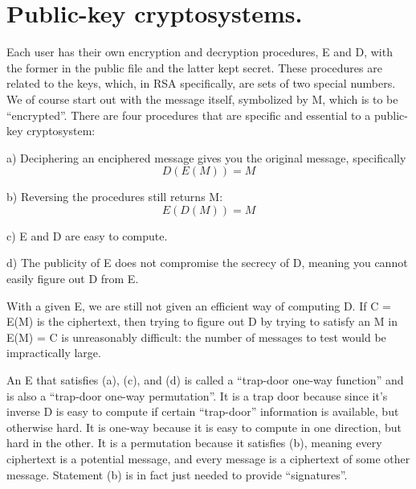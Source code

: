 \documentclass{article}
\begin{document}
\section{Public-key cryptosystems.}

Each user has their own encryption and decryption procedures, E and D, with the former in the public ﬁle and the latter kept secret. These procedures are related to the keys, which, in RSA speciﬁcally, are sets of two special numbers. We of course start out with the message itself, symbolized by M, which is to be “encrypted”. There are four procedures that are speciﬁc and essential to a public-key cryptosystem:
\\\par\setlength\parindent{2em}

a) Deciphering an enciphered message gives you the original message, speciﬁcally
\begin{equation}
D(E(M)) = M
\end{equation}

b) Reversing the procedures still returns M:
\begin{equation}
E(D(M)) = M
\end{equation}

c) E and D are easy to compute.
\\\par\setlength\parindent{2em}

d) The publicity of E does not compromise the secrecy of D, meaning you cannot easily ﬁgure out D from E.
\\\par\setlength\parindent{2em}

With a given E, we are still not given an eﬃcient way of computing D. If C = E(M) is the ciphertext, then trying to ﬁgure out D by trying to satisfy an M in E(M) = C is unreasonably diﬃcult: the number of messages to test would be impractically large.
\\\par\setlength\parindent{2em}

An E that satisﬁes (a), (c), and (d) is called a “trap-door one-way function” and is also a “trap-door one-way permutation”. It is a trap door because since it’s inverse D is easy to compute if certain “trap-door” information is available, but otherwise hard. It is one-way because it is easy to compute in one direction, but hard in the other. It is a permutation because it satisﬁes (b), meaning every ciphertext is a potential message, and every message is a ciphertext of some other message. Statement (b) is in fact just needed to provide “signatures”.
\\\par\setlength\parindent{2em}
\end{document}
